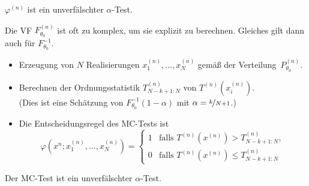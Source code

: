 \documentclass{cheat-sheet}
\begin{document}
\begin{lem}
  $\varphi^{(n)}$ ist ein unverfälschter $\alpha$-Test.
\end{lem}

\begin{problem}
  Die VF $F_{\theta_0}^{(n)}$ ist oft zu komplex, um sie explizit zu berechnen.
  Gleiches gilt dann auch für $F_{\theta_0}^{-1}$.
\end{problem}

\begin{verf}
  \begin{itemize}
    \item Erzeugung von $N$ Realisierungen $x_1^{(n)}, \ldots, x_N^{(n)}$ gemäß der Verteilung~$P_{\theta_0}^{(n)}$.
    \item Berechnen der Ordnungsstatistik $T_{N-k+1 : N}^{(n)}$ von $T^{(n)}(x_i^{(n)})$. \\
    (Dies ist eine Schätzung von $F_{\theta_0}^{-1}(1 - \alpha)$ mit $\alpha = \nicefrac{k}{N+1}$.)
    \item Die Entscheidungsregel des MC-Tests ist
    \[
      \varphi(x^{n}; x_1^{(n)}, \ldots, x_N^{(n)}) = \begin{cases}
        1 & \text{falls } T^{(n)} (x^{(n)}) > T_{N-k+1 : N}^{(n)}, \\
        0 & \text{falls } T^{(n)} (x^{(n)}) \leq T_{N-k+1 : N}^{(n)}
      \end{cases}
    \]
  \end{itemize}
\end{verf}


\begin{lem}
  Der MC-Test ist ein unverfälschter $\alpha$-Test.
\end{lem}
\end{document}
